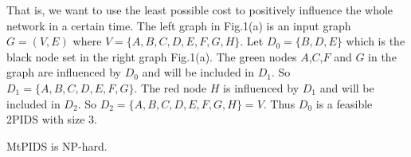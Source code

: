 That is, we want to use the least possible cost to positively influence the whole network in a certain time.
The left graph in Fig.1(a) is an input graph $G=(V , E)$ where $V = \{A ,B ,C ,D , E , F , G , H\}$.
Let $D_0 = \{B ,D ,E\}$ which is the black node set in the right graph Fig.1(a).
The green nodes $A$,$C$,$F$ and $G$ in the graph are influenced by $D_0$ and will be included in $D_1$. So $D_1=\{A ,B ,C,D , E,F ,G\}$.
The red node $H$ is influenced by $D_1$ and will be included in $D_2$. So $D_2 = \{A ,B ,C ,D , E , F , G , H\} = V$.
Thus $D_0$ is a feasible 2PIDS with size 3.
\begin{theorem}
	MtPIDS is NP-hard.
\end{theorem}

